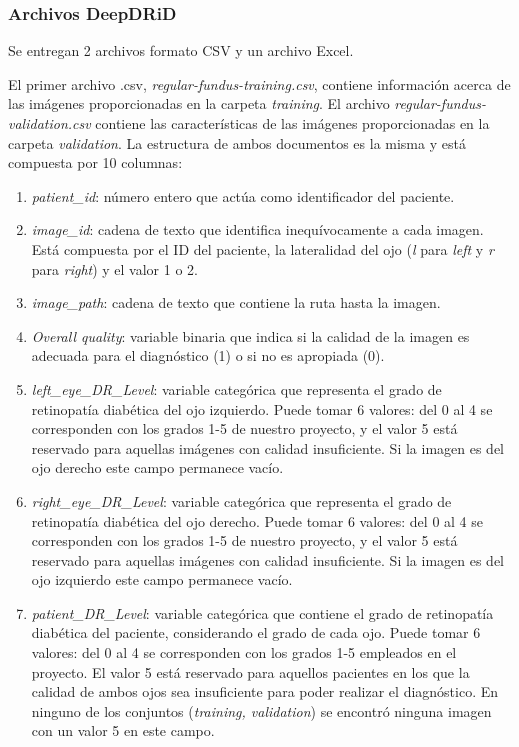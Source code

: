 \subsubsection{Archivos DeepDRiD}

Se entregan 2 archivos formato CSV y un archivo Excel.

El primer archivo .csv, \textit{regular-fundus-training.csv}, contiene información acerca de las imágenes proporcionadas en la carpeta \textit{training}. El archivo \textit{regular-fundus-validation.csv} contiene las características de las imágenes proporcionadas en la carpeta \textit{validation}. La estructura de ambos documentos es la misma y está compuesta por 10 columnas:

\begin{enumerate}
    \item \textit{patient\_id}: número entero que actúa como identificador del paciente.
    \item \textit{image\_id}: cadena de texto que identifica inequívocamente a cada imagen. Está compuesta por el ID del paciente, la lateralidad del ojo (\textit{l} para \textit{left} y \textit{r} para \textit{right}) y el valor 1 o 2.
    \item \textit{image\_path}: cadena de texto que contiene la ruta hasta la imagen.
    \item \textit{Overall quality}: variable binaria que indica si la calidad de la imagen es adecuada para el diagnóstico (1) o si no es apropiada (0).
    \item \textit{left\_eye\_DR\_Level}: variable categórica que representa el grado de retinopatía diabética del ojo izquierdo. Puede tomar 6 valores: del 0 al 4 se corresponden con los grados 1-5 de nuestro proyecto, y el valor 5 está reservado para aquellas imágenes con calidad insuficiente. Si la imagen es del ojo derecho este campo permanece vacío.
    \item \textit{right\_eye\_DR\_Level}:  variable categórica que representa el grado de retinopatía diabética del ojo derecho. Puede tomar 6 valores: del 0 al 4 se corresponden con los grados 1-5 de nuestro proyecto, y el valor 5 está reservado para aquellas imágenes con calidad insuficiente. Si la imagen es del ojo izquierdo este campo permanece vacío.
    \item \textit{patient\_DR\_Level}: variable categórica que contiene el grado de retinopatía diabética del paciente, considerando el grado de cada ojo. Puede tomar 6 valores: del 0 al 4 se corresponden con los grados 1-5 empleados en el proyecto. El valor 5 está reservado para aquellos pacientes en los que la calidad de ambos ojos sea insuficiente para poder realizar el diagnóstico. En ninguno de los conjuntos (\textit{training, validation}) se encontró ninguna imagen con un valor 5 en este campo.

\end{enumerate}

